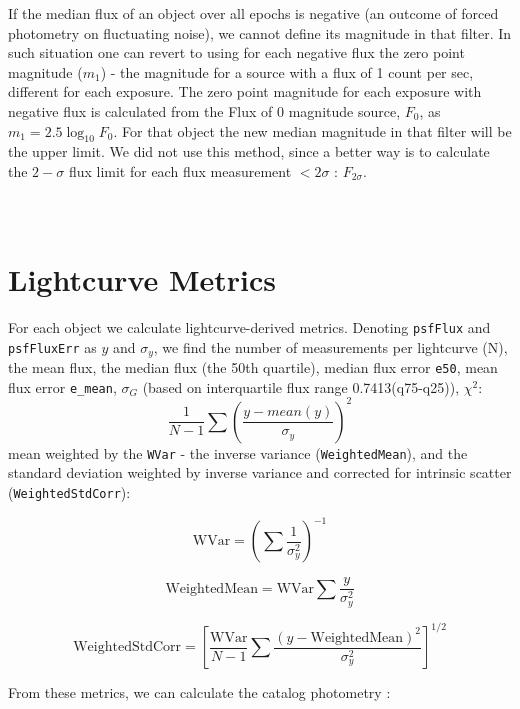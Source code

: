 \documentclass[fleqn,usenatbib]{mnras}  %
\begin{document}
If the median flux of an object over all epochs  is negative (an outcome of forced photometry on fluctuating noise), we cannot define its magnitude in that filter.  In such situation one can revert to  using for each negative flux the zero point magnitude ($m_1$) - the magnitude for a source with a flux of 1 count per sec, different for each exposure.  The zero point magnitude for each exposure with negative flux is calculated from the  Flux of 0 magnitude source,  $F_0$,  as  $m_{1} = 2.5 \log_{10}{F_{0}}$. For that object the new median magnitude in that filter will be the upper limit. We did not use this method, since a better way is to calculate the $2-\sigma$ flux limit for each flux measurement $< 2 \sigma$ : $F_{2\sigma}$. 

\section{\\ Lightcurve Metrics}
For each object we calculate lightcurve-derived metrics. Denoting \verb|psfFlux| and \verb|psfFluxErr| as $y$ and $\sigma_{y}$, we find the number of measurements per lightcurve (N), the mean flux, the median flux (the 50th quartile), median flux error \verb|e50|, mean flux error \verb|e_mean|, $\sigma_{G}$ (based on interquartile flux range 0.7413(q75-q25)), $\chi^{2}$:
\begin{equation}
\frac{1}{N-1} \sum{\left( \frac{y-mean(y)}{\sigma_{y}} \right) ^{2}}
\end{equation}
 mean weighted by the \verb|WVar| - the inverse variance (\verb|WeightedMean|), and the standard deviation weighted by inverse variance and corrected for intrinsic scatter (\verb|WeightedStdCorr|):

\begin{equation}
\mbox{WVar} = \left( \sum{\frac{1}{\sigma_{y}^{2}}} \right) ^{-1}
\end{equation} 

\begin{equation}
\mbox{WeightedMean} = \mbox{WVar} \sum{\frac{y}{\sigma_{y}^{2}}}
\end{equation}

\begin{equation}
\mbox{WeightedStdCorr} =  \left[ \frac{ \mbox{WVar}  }{N-1} \sum{\frac{(y-\mbox{WeightedMean})^{2}}{\sigma_{y}^{2}}} \right] ^{1/2}
\end{equation}



From these metrics, we can calculate the catalog photometry  :
\end{document}
